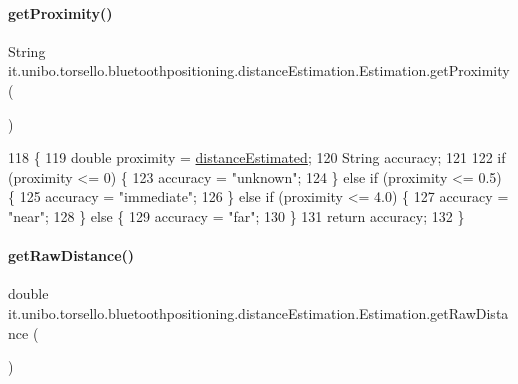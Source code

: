 \paragraph{\texorpdfstring{get\+Proximity()}{getProximity()}}
{\footnotesize\ttfamily String it.\+unibo.\+torsello.\+bluetoothpositioning.\+distance\+Estimation.\+Estimation.\+get\+Proximity (\begin{DoxyParamCaption}{ }\end{DoxyParamCaption})}


\begin{DoxyCode}
118                                  \{
119         \textcolor{keywordtype}{double} proximity = \hyperlink{classit_1_1unibo_1_1torsello_1_1bluetoothpositioning_1_1distanceEstimation_1_1Estimation_a7a5514b25ac6495842a53e54319be10d_a7a5514b25ac6495842a53e54319be10d}{distanceEstimated};
120         String accuracy;
121 
122         \textcolor{keywordflow}{if} (proximity <= 0) \{
123             accuracy = \textcolor{stringliteral}{"unknown"};
124         \} \textcolor{keywordflow}{else} \textcolor{keywordflow}{if} (proximity <= 0.5) \{
125             accuracy = \textcolor{stringliteral}{"immediate"};
126         \} \textcolor{keywordflow}{else} \textcolor{keywordflow}{if} (proximity <= 4.0) \{
127             accuracy = \textcolor{stringliteral}{"near"};
128         \} \textcolor{keywordflow}{else} \{
129             accuracy = \textcolor{stringliteral}{"far"};
130         \}
131         \textcolor{keywordflow}{return} accuracy;
132     \}
\end{DoxyCode}
\hypertarget{classit_1_1unibo_1_1torsello_1_1bluetoothpositioning_1_1distanceEstimation_1_1Estimation_ad355b2e850a8d6013ef771eecd740e1b_ad355b2e850a8d6013ef771eecd740e1b}{}\label{classit_1_1unibo_1_1torsello_1_1bluetoothpositioning_1_1distanceEstimation_1_1Estimation_ad355b2e850a8d6013ef771eecd740e1b_ad355b2e850a8d6013ef771eecd740e1b} 
\paragraph{\texorpdfstring{get\+Raw\+Distance()}{getRawDistance()}}
{\footnotesize\ttfamily double it.\+unibo.\+torsello.\+bluetoothpositioning.\+distance\+Estimation.\+Estimation.\+get\+Raw\+Distance (\begin{DoxyParamCaption}{ }\end{DoxyParamCaption})}


